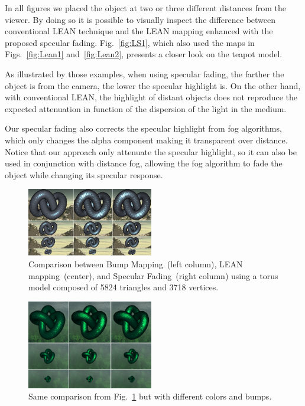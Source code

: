\documentclass[10pt, conference]{IEEEtran}
\begin{document}
In all figures we placed the object at two or three different distances from the viewer. By doing so it is possible to visually inspect the difference between conventional LEAN technique and the LEAN mapping enhanced with the proposed specular fading. Fig.~\ref{fig:LS1}, which also used the maps in Figs.~\ref{fig:Lean1} and~\ref{fig:Lean2}, presents a closer look on the teapot model.

As illustrated by those examples, when using specular fading, the farther the object is from the camera, the lower the specular highlight is. On the other hand, with conventional LEAN, the highlight of distant objects does not reproduce the expected attenuation in function of the dispersion of the light in the medium.

Our specular fading also corrects the specular highlight from fog algorithms, which only changes the alpha component making it transparent over distance. Notice that our approach only attenuate the specular highlight, so it can also be used in conjunction with distance fog, allowing the fog algorithm to fade the object while changing its specular response.

\begin{figure}[t]
	\includegraphics[width=0.49\textwidth]{figs/torus1.png}
	\caption{Comparison between Bump Mapping~(left column), LEAN mapping~(center), and Specular Fading~(right column) using a torus model composed of 5824 triangles and 3718 vertices.}
	\label{fig:torus1}
\end{figure}

\begin{figure}[t]
	\includegraphics[width=0.49\textwidth]{figs/torus2.png}
	\caption{Same comparison from Fig.~\ref{fig:torus1} but with different colors and bumps.}
	\label{fig:torus2}
\end{figure}
\end{document}
